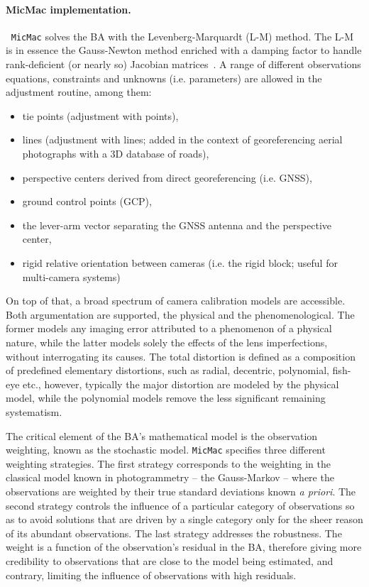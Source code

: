 \documentclass[twocolumn]{bmcart}%
\begin{document}
\paragraph*{MicMac implementation. }
%
{$\:${ \tt MicMac}} solves the BA with the Levenberg-Marquardt (L-M) method. The L-M is in essence the Gauss-Newton method enriched with a damping factor to handle rank-deficient (or nearly so) Jacobian matrices~\cite{nocedal2006numerical}. A range of different observations equations, constraints and unknowns (i.e. parameters) are allowed in the adjustment routine, among them:
\begin{itemize}
\item tie points (adjustment with points),
\item lines (adjustment with lines; added in the context of georeferencing aerial photographs with a 3D database of roads),
\item perspective centers derived from direct georeferencing (i.e. GNSS),
\item ground control points (GCP),
\item the lever-arm vector separating the GNSS antenna and the perspective center,
\item rigid relative orientation between cameras (i.e. the rigid block; useful for multi-camera systems)
\end{itemize}
%
On top of that, a broad spectrum of camera calibration models are accessible. Both argumentation are supported, the physical and the phenomenological. The former models any imaging error attributed to a phenomenon of a physical nature, while the latter models solely the effects of the lens imperfections, without interrogating its causes. The total distortion is defined as a composition of predefined elementary distortions, such as radial, decentric, polynomial, fish-eye etc., however, typically the major distortion are modeled by the physical model, while the polynomial models remove the less significant remaining systematism.\par 
%
The critical element of the BA's mathematical model is the observation weighting, known as the stochastic model. {\tt MicMac} specifies three different weighting strategies. The first strategy corresponds to the weighting in the classical model known in photogrammetry -- the Gauss-Markov -- where the observations are weighted by their true standard deviations known \textit{a priori}. The second strategy controls the influence of a particular category of observations so as to avoid solutions that are driven by a single category only for the sheer reason of its abundant observations. The last strategy addresses the robustness. The weight is a function of the observation's residual in the BA, therefore giving more credibility to observations that are close to the model being estimated, and contrary, limiting the influence of observations with high residuals.
%
\end{document}
